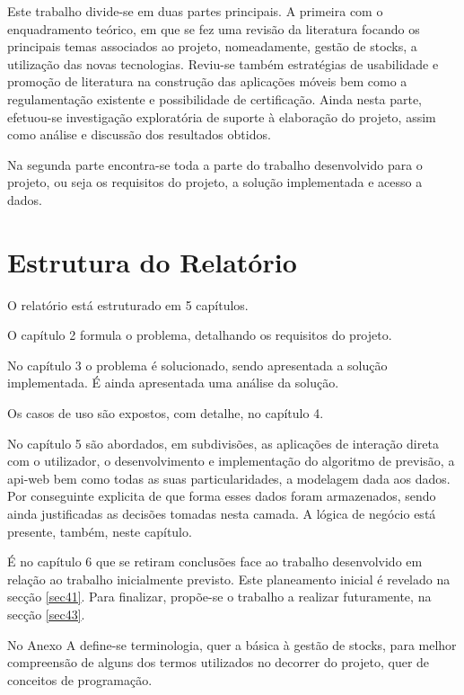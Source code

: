 Este trabalho divide-se em duas partes principais. A primeira com o enquadramento teórico, em que se fez uma revisão da literatura focando os principais temas associados ao projeto, nomeadamente, gestão de stocks, a utilização das novas tecnologias. Reviu-se também estratégias de usabilidade e promoção de literatura na construção das aplicações móveis bem como a regulamentação existente e possibilidade de certificação.
Ainda nesta parte, efetuou-se investigação exploratória de suporte à elaboração do projeto, assim como análise e discussão dos resultados obtidos.

Na segunda parte encontra-se toda a parte do trabalho desenvolvido para o projeto, ou seja os requisitos do projeto, a solução implementada e acesso a dados.


%
%
\section{Estrutura do Relatório} \label{sec14}
O relatório está estruturado em 5 capítulos.

O capítulo 2 formula o problema, detalhando os requisitos do projeto. 

No capítulo 3 o problema é solucionado, sendo apresentada a solução implementada. É ainda apresentada uma análise da solução.

Os casos de uso são expostos, com detalhe, no capítulo 4.

No capítulo 5 são abordados, em subdivisões, as aplicações de interação direta com o utilizador, o desenvolvimento e implementação do algoritmo de previsão, a \gls{api-web} bem como todas as suas particularidades, a modelagem dada aos dados. Por conseguinte explicita de que forma esses dados foram armazenados, sendo ainda justificadas as decisões tomadas nesta camada. A lógica de negócio está presente, também, neste capítulo. 

É no capítulo 6 que se retiram conclusões face ao trabalho desenvolvido em relação ao trabalho inicialmente previsto. Este planeamento inicial é revelado na secção \ref{sec41}. Para finalizar, propõe-se o trabalho a realizar futuramente, na secção \ref{sec43}.

No Anexo A define-se terminologia, quer a básica à gestão de stocks, para melhor compreensão de alguns dos termos utilizados no decorrer do projeto, quer de conceitos de programação.

